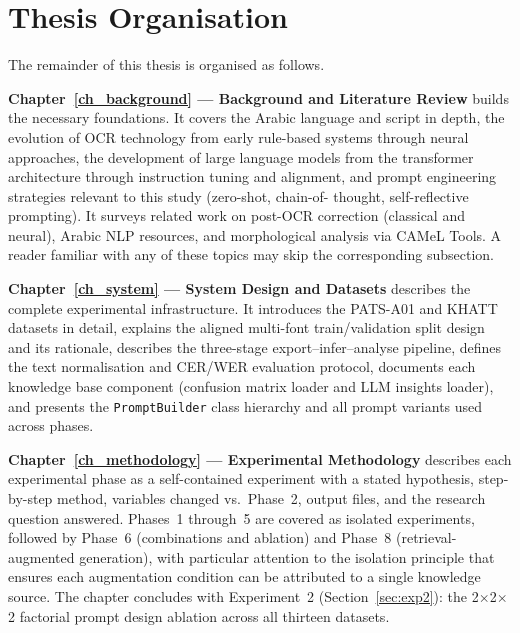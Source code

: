 \section{Thesis Organisation}
\label{sec:intro_organisation}

The remainder of this thesis is organised as follows.

\textbf{Chapter~\ref{ch_background} --- Background and Literature Review}
builds the necessary foundations. It covers the Arabic language and script
in depth, the evolution of OCR technology from early rule-based systems
through neural approaches, the development of large language models from
the transformer architecture through instruction tuning and alignment, and
prompt engineering strategies relevant to this study (zero-shot, chain-of-
thought, self-reflective prompting). It surveys related work on post-OCR
correction (classical and neural), Arabic NLP resources, and morphological
analysis via CAMeL Tools. A reader familiar with any of these topics may
skip the corresponding subsection.

\textbf{Chapter~\ref{ch_system} --- System Design and Datasets}
describes the complete experimental infrastructure. It introduces the
PATS-A01 and KHATT datasets in detail, explains the aligned multi-font
train/validation split design and its rationale, describes the three-stage
export--infer--analyse pipeline, defines the text normalisation and
CER/WER evaluation protocol, documents each knowledge base component
(confusion matrix loader and LLM insights loader), and presents the
\texttt{PromptBuilder} class hierarchy and all prompt variants used across
phases.

\textbf{Chapter~\ref{ch_methodology} --- Experimental Methodology}
describes each experimental phase as a self-contained experiment with a
stated hypothesis, step-by-step method, variables changed vs.\ Phase~2,
output files, and the research question answered. Phases~1 through~5 are
covered as isolated experiments, followed by Phase~6 (combinations and
ablation) and Phase~8 (retrieval-augmented generation), with particular
attention to the isolation principle that ensures each augmentation condition
can be attributed to a single knowledge source. The chapter concludes with
Experiment~2 (Section~\ref{sec:exp2}): the 2$\times$2$\times$2 factorial
prompt design ablation across all thirteen datasets.

